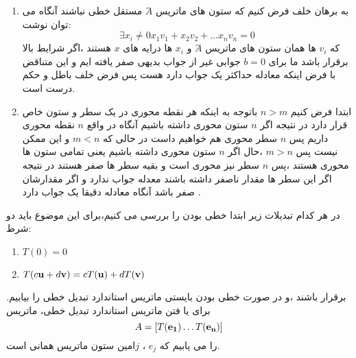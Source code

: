 \documentclass{article}
\begin{document}
\begin{enumerate}
\item
به برهان خلف فرض کنیم که ستون های ماتریس $َA$ مستقل خطی نباشند آنگاه می توان نوشت:
$$\exists x_i\neq0 x_1v_1+x_2v_2+\ldots x_nv_n=0$$
که 
$v_i$
ها همان ستون های ماتریس $َA$ و 
$x_i$
ها درایه های $x$ هستند ،اگر شرایط بالا برقرار باشد ما برای 
$b=0$
جوابی غیر از جواب بدیهی  صفر یافته ایم و این متناقض با فرض اینکه معادله حداکثر یک جواب دارد هست پس فرض خلف باطل و حکم درست است.

\item
ابتدا فرض کنیم 
$n>m$
 باتوجه به اینکه هر نقطه محوری در یک سطر و ستون خاص قرار دارد در نتیجه اگر 
 $n$
 ستون محوری داشته باشیم آنگاه در واقع $n$ نقطه محوری داریم پس $n$ سطر محوری هم خواهیم داست در حالی که 
 $m<n$
 و این ممکن نیست 
 پس 
 $m>n$
 ،حال اگر $n$  ستون محوری داشته باشیم یعنی تمامی ستون ها محوری هستند ،پس $n$ سطر نیز محوری است و بقیه سطر ها صفر هستند در نتیجه اگر این سطر ها مقدار ناصفر داشته باشند معدله جواب ندارد و اگر مقدارشان صفر باشد آنگاه معادله دقیقا یک جواب دارد .	
\end{enumerate}
در هر کدام تبدیلات زیر ابتدا خطی بودن را بررسی می کنیم،برای این موضوع باید دو شرط:
\begin{enumerate}
	\item $T(0)=0$
	\item $T(c{\bf u}+d{\bf v})=cT({\bf u})+dT({\bf v})$
\end{enumerate}

	برقرار باشند ،و در صورت خطی بودن بایستی ماتریس استاندارد تبدیل خطی را بیابیم.
	برای یا فتن ماتریس استاندارد تبدیل خطی، ماتریس
	$$A= [T({\bf e_1}) \ldots T({\bf e_n})]$$
	را می یابیم که 
	$e_j$ 
	،
	$j$امین ستون ماتریس همانی است.
	 
\end{document}
